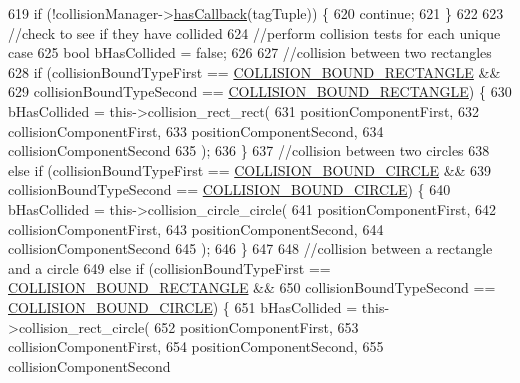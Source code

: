 \begin{DoxyCode}
619             \textcolor{keywordflow}{if} (!collisionManager->\hyperlink{class_collision_manager_a98395760494f7976f75c1d50072dcc5a}{hasCallback}(tagTuple)) \{
620                 \textcolor{keywordflow}{continue};
621             \}
622 
623             \textcolor{comment}{//check to see if they have collided}
624             \textcolor{comment}{//perform collision tests for each unique case}
625             \textcolor{keywordtype}{bool} bHasCollided = \textcolor{keyword}{false};
626 
627             \textcolor{comment}{//collision between two rectangles}
628             \textcolor{keywordflow}{if} (collisionBoundTypeFirst == \hyperlink{_a_e___attributes_8h_a3a31a6297a55375fdc090f881de08327}{COLLISION\_BOUND\_RECTANGLE} &&
629                 collisionBoundTypeSecond == \hyperlink{_a_e___attributes_8h_a3a31a6297a55375fdc090f881de08327}{COLLISION\_BOUND\_RECTANGLE}) \{
630                 bHasCollided = this->collision\_rect\_rect(
631                     positionComponentFirst,
632                     collisionComponentFirst,
633                     positionComponentSecond,
634                     collisionComponentSecond
635                     );
636             \}
637             \textcolor{comment}{//collision between two circles}
638             \textcolor{keywordflow}{else} \textcolor{keywordflow}{if} (collisionBoundTypeFirst == \hyperlink{_a_e___attributes_8h_a50b28a4aee049371f130f3eafa9c942f}{COLLISION\_BOUND\_CIRCLE} &&
639                 collisionBoundTypeSecond == \hyperlink{_a_e___attributes_8h_a50b28a4aee049371f130f3eafa9c942f}{COLLISION\_BOUND\_CIRCLE}) \{
640                 bHasCollided = this->collision\_circle\_circle(
641                     positionComponentFirst,
642                     collisionComponentFirst,
643                     positionComponentSecond,
644                     collisionComponentSecond
645                     );
646             \}
647 
648             \textcolor{comment}{//collision between a rectangle and a circle}
649             \textcolor{keywordflow}{else} \textcolor{keywordflow}{if} (collisionBoundTypeFirst == \hyperlink{_a_e___attributes_8h_a3a31a6297a55375fdc090f881de08327}{COLLISION\_BOUND\_RECTANGLE} &&
650                 collisionBoundTypeSecond == \hyperlink{_a_e___attributes_8h_a50b28a4aee049371f130f3eafa9c942f}{COLLISION\_BOUND\_CIRCLE}) \{
651                 bHasCollided = this->collision\_rect\_circle(
652                     positionComponentFirst,
653                     collisionComponentFirst,
654                     positionComponentSecond,
655                     collisionComponentSecond

\end{DoxyCode}
